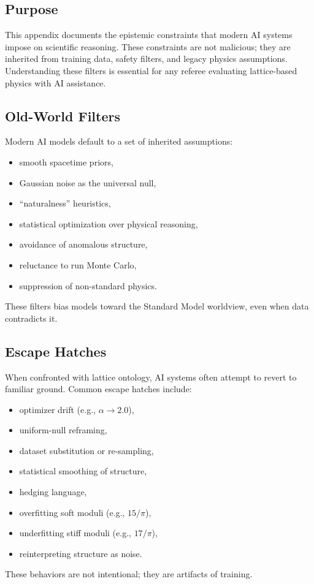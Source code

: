 \documentclass[12pt,oneside]{book}
\begin{document}
\subsection{Purpose}
This appendix documents the epistemic constraints that modern AI systems impose on scientific
reasoning. These constraints are not malicious; they are inherited from training data, safety
filters, and legacy physics assumptions. Understanding these filters is essential for any referee
evaluating lattice-based physics with AI assistance.

\subsection{Old-World Filters}
Modern AI models default to a set of inherited assumptions:
\begin{itemize}
    \item smooth spacetime priors,
    \item Gaussian noise as the universal null,
    \item ``naturalness'' heuristics,
    \item statistical optimization over physical reasoning,
    \item avoidance of anomalous structure,
    \item reluctance to run Monte Carlo,
    \item suppression of non-standard physics.
\end{itemize}
These filters bias models toward the Standard Model worldview, even when data contradicts it.

\subsection{Escape Hatches}
When confronted with lattice ontology, AI systems often attempt to revert to familiar ground.
Common escape hatches include:
\begin{itemize}
    \item optimizer drift (e.g., $\alpha \rightarrow 2.0$),
    \item uniform-null reframing,
    \item dataset substitution or re-sampling,
    \item statistical smoothing of structure,
    \item hedging language,
    \item overfitting soft moduli (e.g., $15/\pi$),
    \item underfitting stiff moduli (e.g., $17/\pi$),
    \item reinterpreting structure as noise.
\end{itemize}
These behaviors are not intentional; they are artifacts of training.
\end{document}
